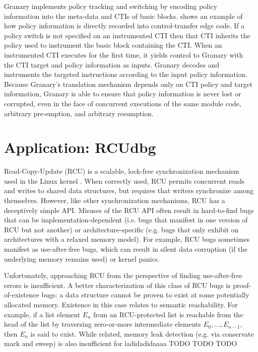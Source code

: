 \documentclass[preprint]{sigplanconf}
\begin{document}
Granary implements policy tracking and switching by encoding policy information into the meta-data and CTIs of basic blocks.  shows an example of how policy information is directly recorded into control-transfer edge code. If a policy switch is not specified on an instrumented CTI then that CTI inherits the policy used to instrument the basic block containing the CTI. When an instrumented CTI executes for the first time, it yields control to Granary with the CTI target and policy information as inputs. Granary decodes and instruments the targeted instructions according to the input policy information. Because Granary's translation mechanism depends only on CTI policy and target information, Granary is able to ensure that policy information is never lost or corrupted, even in the face of concurrent executions of the same module code, arbitrary pre-emption, and arbitrary resumption.

\section{Application: RCUdbg}

Read-Copy-Update (RCU) is a scalable, lock-free synchronization mechanism used in the Linux kernel \cite{RCU,RCUInLinux}. When correctly used, RCU permits concurrent reads and writes to shared data structures, but requires that writers synchronize among themselves. However, like other synchronization mechanisms, RCU has a deceptively simple API. Misuses of the RCU API often result in hard-to-find bugs that can be implementation-dependent (i.e. bugs that manifest in one version of RCU but not another) or architecture-specific (e.g. bugs that only exhibit on architectures with a relaxed memory model). For example, RCU bugs sometimes manifest as use-after-free bugs, which can result in silent data corruption (if the underlying memory remains used) or kernel panics. 

Unfortunately, approaching RCU from the perspective of finding use-after-free errors is insufficient. A better characterization of this class of RCU bugs is proof-of-existence bugs: a data structure cannot be proven to exist at some potentially allocated memory. Existence in this case relates to semantic reachability. For example, if a list element $E_n$ from an RCU-protected list is reachable from the head of the list by traversing zero-or-more intermediate elements $E_0, ..., E_{n-1}$, then $E_n$ is said to exist. While related, memory leak detection (e.g. via conservate mark and sweep) is also insufficient for ladidadidaaaa TODO TODO TODO
\end{document}
